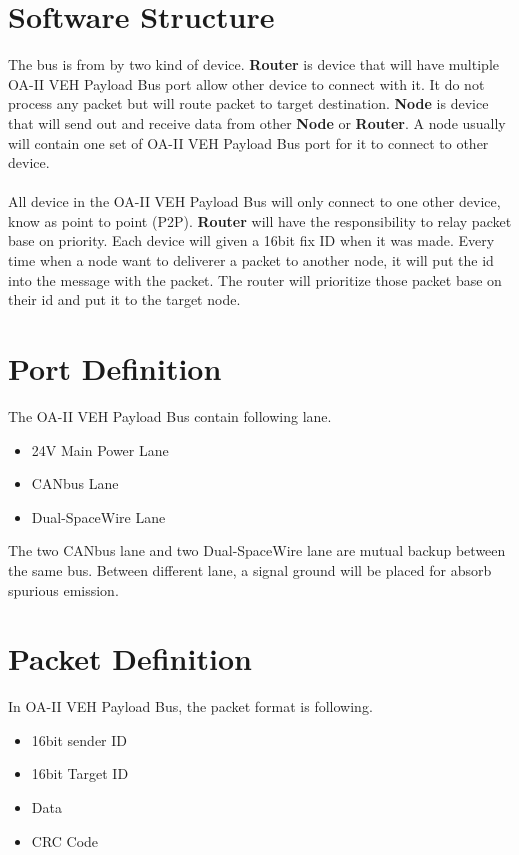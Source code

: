 \documentclass[12pt,article]{memoir}
\begin{document}
\section{Software Structure}
The bus is from by two kind of device. \textbf{Router} is device that will have multiple OA-II VEH Payload Bus port allow other device to connect with it. It do not process any packet but will route packet to target destination. \textbf{Node} is device that will send out and receive data from other \textbf{Node} or \textbf{Router}. A node usually will contain one set of OA-II VEH Payload Bus port for it to connect to other device.\\\\
All device in the OA-II VEH Payload Bus will only connect to one other device, know as point to point (P2P). \textbf{Router} will have the responsibility to relay packet base on priority. Each device will given a 16bit fix ID when it was made. Every time when a node want to deliverer a packet to another node, it will put the id into the message with the packet. The router will prioritize those packet base on their id and put it to the target node.
\section{Port Definition}
The OA-II VEH Payload Bus contain following lane.
\begin{itemize}
	\item 24V Main Power Lane 
	\item CANbus Lane 
	\item Dual-SpaceWire Lane 
\end{itemize}
The two CANbus lane and two Dual-SpaceWire lane are mutual backup between the same bus. Between different lane, a signal ground will be placed for absorb spurious emission.
\section{Packet Definition}
In OA-II VEH Payload Bus, the packet format is following.
\begin{itemize}
	\item 16bit sender ID
	\item 16bit Target ID
	\item Data
	\item CRC Code
\end{itemize}
\newpage
\end{document}
